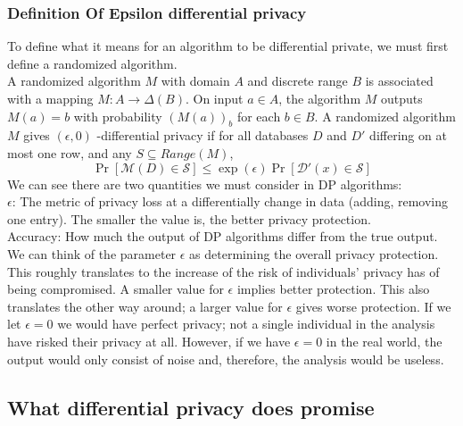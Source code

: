 \documentclass[11pt]{article}
\theoremstyle{definition}
\begin{document}
\subsubsection{Definition Of Epsilon differential privacy}
To define what it means for an algorithm to be differential private, we must first define a randomized algorithm.\\ A randomized algorithm $M$ with domain $A$ and discrete range $B$ is associated with a mapping $M:A\rightarrow\Delta(B)$. On input $a\in A$, the algorithm $M$ outputs $M(a) =b$ with probability $(M(a))_b$ for each $b\in B$.
A randomized algorithm $M$ gives $(\epsilon,0)$ -differential privacy if for all databases $D$ and $D'$ differing on at most one row, and any $S \subseteq Range(M)$,
\[
\operatorname{Pr}[\mathcal{M}(D) \in \mathcal{S}] \leq \exp (\epsilon) \operatorname{Pr}[\mathcal{D'}(x) \in \mathcal{S}]
\]
We can see there are two quantities we must consider in DP algorithms: \\ $\epsilon$: The metric of privacy loss at a differentially change in data (adding, removing one entry). The smaller the value is, the better privacy protection. \\ Accuracy: How much the output of DP algorithms differ from the true output.
We can think of the parameter $\epsilon$ as determining the overall privacy protection. This roughly translates to the increase of the risk of individuals' privacy has of being compromised. A smaller value for $\epsilon$ implies better protection. This also translates the other way around; a larger value for $\epsilon$ gives worse protection. If we let $\epsilon = 0$ we would have perfect privacy; not a single individual in the analysis have risked their privacy at all. However, if we have $\epsilon = 0$ in the real world, the output would only consist of noise and, therefore, the analysis would be useless.

\subsection{What differential privacy does promise}
\end{document}
